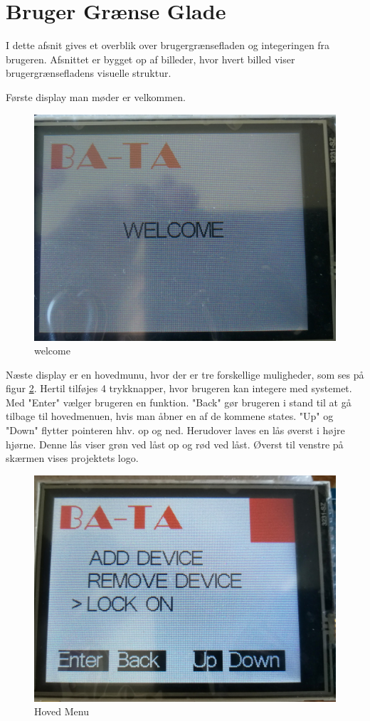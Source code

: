 \graphicspath{{Chapters/Userinterface/}}


\section{Bruger Grænse Glade}
I dette afsnit gives et overblik over brugergrænsefladen og integeringen fra brugeren. Afsnittet er bygget op af billeder, hvor hvert billed viser brugergrænsefladens visuelle struktur. 

Første display man møder er velkommen. 
\begin{figure}[H]
	\centering
	\includegraphics[width = 300 pt]{Img/welcome.jpg}
	\caption{welcome}
	\label{fig:welcome}
\end{figure}
Næste display er en hovedmunu, hvor der er tre forskellige muligheder, som ses på \\figur     \ref{fig:start}. Hertil tilføjes 4 trykknapper, hvor brugeren kan integere med systemet. Med "Enter" vælger brugeren en funktion. "Back" gør brugeren i stand til at gå tilbage til hovedmenuen, hvis man åbner en af de kommene states. "Up" og "Down" flytter pointeren hhv. op og ned. Herudover laves en lås øverst i højre hjørne. Denne lås viser grøn ved låst op og rød ved låst. Øverst til venstre på skærmen vises projektets logo.    
\begin{figure}[H]
	\centering
	\includegraphics[width = 300 pt]{Img/start.jpg}
	\caption{Hoved Menu}
	\label{fig:start}
\end{figure}

